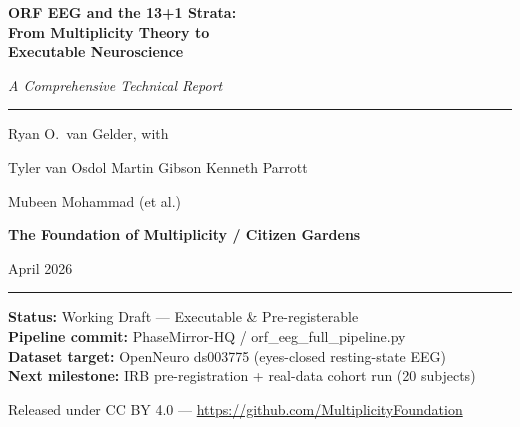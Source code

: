 \documentclass[12pt,a4paper]{article}
\theoremstyle{plain}
\theoremstyle{definition}
\begin{document}
\begin{titlepage}
  \centering
  \vspace*{2cm}
  {\Huge\bfseries ORF EEG and the 13+1 Strata:\\[0.4em]
  From Multiplicity Theory to\\[0.2em]
  Executable Neuroscience\par}
  \vspace{1.5cm}
  {\large\itshape A Comprehensive Technical Report\par}
  \vspace{1cm}
  \rule{0.7\linewidth}{0.5pt}
  \vspace{0.8cm}

  {\large Ryan O.\ van Gelder, with\par}
  {\large Tyler van Osdol \textperiodcentered{} Martin Gibson \textperiodcentered{} Kenneth Parrott\par}
  {\large Mubeen Mohammad (et al.)\par}
  \vspace{0.8cm}
  {\large\textbf{The Foundation of Multiplicity / Citizen Gardens}\par}
  \vspace{0.4cm}
  {\large April 2026\par}
  \vspace{1.5cm}
  \rule{0.7\linewidth}{0.5pt}
  \vspace{1cm}

  \begin{tcolorbox}[
    colback=boxbg, colframe=boxborder, width=0.85\textwidth,
    title={\bfseries Document Status}, fonttitle=\small\bfseries
  ]
    \small
    \textbf{Status:} Working Draft --- Executable \& Pre-registerable\\
    \textbf{Pipeline commit:} PhaseMirror-HQ / orf\_eeg\_full\_pipeline.py\\
    \textbf{Dataset target:} OpenNeuro ds003775 (eyes-closed resting-state EEG)\\
    \textbf{Next milestone:} IRB pre-registration + real-data cohort run (20 subjects)
  \end{tcolorbox}

  \vfill
  \small Released under CC BY 4.0 --- \url{https://github.com/MultiplicityFoundation}
\end{titlepage}
\end{document}
